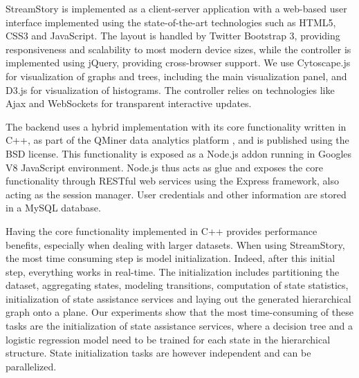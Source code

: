 StreamStory is implemented as a client-server application with a web-based user interface implemented using the state-of-the-art technologies such as HTML5, CSS3 and JavaScript. The layout is handled by Twitter Bootstrap 3, providing responsiveness and scalability to most modern device sizes, while the controller is implemented using jQuery, providing cross-browser support. We use Cytoscape.js for visualization of graphs and trees, including the main visualization panel, and D3.js for visualization of histograms. The controller relies on technologies like Ajax and WebSockets for transparent interactive updates.

The backend uses a hybrid implementation with its core functionality written in C++, as part of the QMiner data analytics platform \cite{qminer}, and is published using the BSD license. This functionality is exposed as a Node.js addon running in Googles V8 JavaScript environment. Node.js thus acts as glue and exposes the core functionality through RESTful web services using the Express framework, also acting as the session manager. User credentials and other information are stored in a MySQL database.

Having the core functionality implemented in C++ provides performance benefits, especially
when dealing with larger datasets. When using StreamStory, the most time consuming step
is model initialization. Indeed, after this initial step, everything works in real-time.
The initialization includes partitioning the dataset, aggregating states, modeling transitions,
computation of state statistics, initialization of state assistance services and laying out the generated
hierarchical graph onto a plane. Our experiments show that the most time-consuming of these tasks are
the initialization of state assistance services, where a decision tree and a logistic regression
model need to be trained for each state in the hierarchical structure. State initialization tasks
are however independent and can be parallelized.


